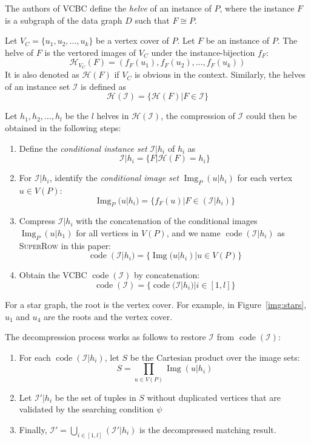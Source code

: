 The authors of VCBC define the \emph{helve} of an instance of $P$,
where the instance $F$ is a subgraph of the data graph $D$ such that $F \cong P$.
\begin{definition}[Helve]
  Let $V_C = \{u_1, u_2, \dots, u_k\}$ be a vertex cover of $P$.
  Let $F$ be an instance of $P$.
  The helve of $F$ is the vertored images of $V_C$ under the instance-bijection $f_F$:
  \[\mathcal{H}_{V_C}(F) = (f_F(u_1), f_F(u_2), \dots, f_F(u_k))\]
  It is also denoted as $\mathcal{H}(F)$ if $V_C$ is obvious in the context.
  Similarly, the helves of an instance set $\mathcal{I}$ is defined as
  \[\mathcal{H}(\mathcal{I}) = \{\mathcal{H}(F) | F\in \mathcal{I}\}\]
\end{definition}
Let $h_1, h_2, \dots, h_l$ be the $l$ helves in $\mathcal{H}(\mathcal{I})$,
the compression of $\mathcal{I}$ could then be obtained in the following steps:
\begin{enumerate}[noitemsep]
\item Define the \emph{conditional instance set} $\mathcal{I}|h_i$ of $h_i$ as
  \[ \mathcal{I}|h_i = \{F | \mathcal{H}(F) = h_i\} \]
\item For $\mathcal{I}|h_i$,
  identify the \emph{conditional image set} $\operatorname{Img}_P(u|h_i)$ for each vertex $u \in V(P)$:
  \[ \operatorname{Img}_P(u|h_i) =\{f_F(u) | F \in (\mathcal{I}|h_i)\} \]
\item Compress $\mathcal{I}|h_i$ with the concatenation of the conditional images $\operatorname{Img}_P(u|h_1)$ for all vertices in $V(P)$, and we name $\operatorname{code}(\mathcal{I}|h_i)$ as \textsc{SuperRow} in this paper:
  \[ \operatorname{code}(\mathcal{I}|h_i) = \{ \operatorname{Img}(u|h_i) | u \in V(P) \} \]
\item Obtain the VCBC $\operatorname{code}(\mathcal{I})$ by concatenation:
  \[ \operatorname{code}(\mathcal{I}) = \{ \operatorname{code}(\mathcal{I}|h_i) | i \in [1,l]\} \]
\end{enumerate}
For a star graph, the root is the vertex cover.
For example, in Figure~\ref{img:stars}, $u_1$ and $u_4$ are the roots and the vertex cover.

The decompression process works as follows to restore $\mathcal{I}$ from $\operatorname{code}(\mathcal{I})$:
\begin{enumerate}[noitemsep]
\item For each $\operatorname{code}(\mathcal{I}|h_i)$, let $S$ be the Cartesian product over the image sets:
  \[ S = \prod_{u \in V(P)} \operatorname{Img}(u | h_i) \]
\item Let $\mathcal{I}'|h_i$ be the set of tuples in $S$ without duplicated vertices that are validated by the searching condition $\psi$
\item Finally, $\mathcal{I}' = \bigcup_{i \in [1, l]}(\mathcal{I}'|h_i)$ is the decompressed matching result.
\end{enumerate}

